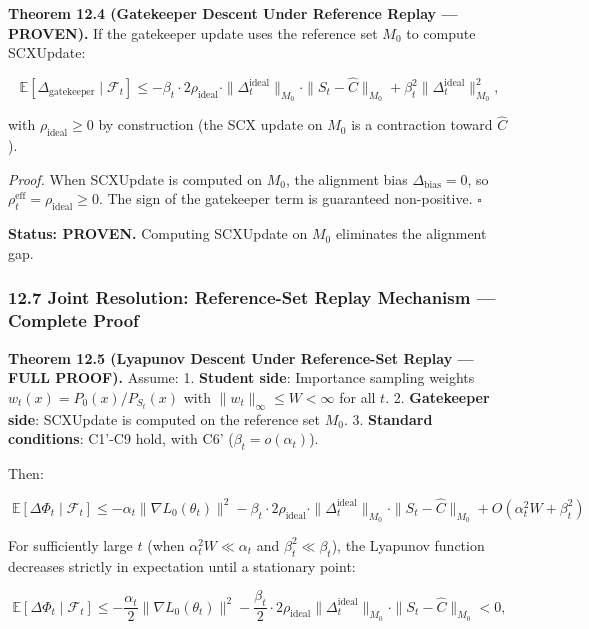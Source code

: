 \documentclass[
  12pt,
]{ctexart}
\begin{document}
\textbf{Theorem 12.4 (Gatekeeper Descent Under Reference Replay ---
PROVEN).} If the gatekeeper update uses the reference set \(M_0\) to
compute SCXUpdate:

\[\mathbb{E}[\Delta_{\text{gatekeeper}} \mid \mathcal{F}_t] \leq -\beta_t \cdot 2\rho_{\text{ideal}} \cdot \|\Delta_t^{\text{ideal}}\|_{M_0} \cdot \|S_t - \hat{C}\|_{M_0} + \beta_t^2 \|\Delta_t^{\text{ideal}}\|_{M_0}^2,\]

with \(\rho_{\text{ideal}} \geq 0\) by construction (the SCX update on
\(M_0\) is a contraction toward \(\hat{C}\)).

\emph{Proof.} When SCXUpdate is computed on \(M_0\), the alignment bias
\(\Delta_{\text{bias}} = 0\), so
\(\rho_t^{\text{eff}} = \rho_{\text{ideal}} \geq 0\). The sign of the
gatekeeper term is guaranteed non-positive. \(\square\)

\textbf{Status: PROVEN.} Computing SCXUpdate on \(M_0\) eliminates the
alignment gap.

\subsubsection{12.7 Joint Resolution: Reference-Set Replay Mechanism ---
Complete
Proof}\label{joint-resolution-reference-set-replay-mechanism-complete-proof}

\textbf{Theorem 12.5 (Lyapunov Descent Under Reference-Set Replay ---
FULL PROOF).} Assume: 1. \textbf{Student side}: Importance sampling
weights \(w_t(x) = P_0(x)/P_{S_t}(x)\) with
\(\|w_t\|_\infty \leq W < \infty\) for all \(t\). 2. \textbf{Gatekeeper
side}: SCXUpdate is computed on the reference set \(M_0\). 3.
\textbf{Standard conditions}: C1'-C9 hold, with C6'
(\(\beta_t = o(\alpha_t)\)).

Then:

\[\boxed{\;\mathbb{E}[\Delta\Phi_t \mid \mathcal{F}_t] \leq -\alpha_t \|\nabla L_0(\theta_t)\|^2 - \beta_t \cdot 2\rho_{\text{ideal}} \cdot \|\Delta_t^{\text{ideal}}\|_{M_0} \cdot \|S_t - \hat{C}\|_{M_0} + O(\alpha_t^2 W + \beta_t^2)\;}\]

For sufficiently large \(t\) (when \(\alpha_t^2 W \ll \alpha_t\) and
\(\beta_t^2 \ll \beta_t\)), the Lyapunov function decreases strictly in
expectation until a stationary point:

\[\mathbb{E}[\Delta\Phi_t \mid \mathcal{F}_t] \leq -\frac{\alpha_t}{2} \|\nabla L_0(\theta_t)\|^2 - \frac{\beta_t}{2} \cdot 2\rho_{\text{ideal}} \|\Delta_t^{\text{ideal}}\|_{M_0} \cdot \|S_t - \hat{C}\|_{M_0} < 0,\]
\end{document}
